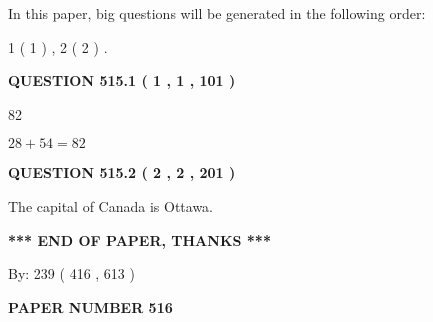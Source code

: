 \documentclass[12pt]{article}
\begin{document}
In this paper, big questions will be generated in the following order: 
   
   
   1 ( 1 )
 ,
   2 ( 2 )
 .
  
\vspace{0.2in}
  
{\textbf{\Large{QUESTION
515.1 
 ( 1 , 1 , 101 )
}}}
  
  
 
 
\noindent{}

82
 
 
 
 
\noindent{}

$ %
28 +  %
54=   %
82$
 
 
  
\vspace{0.2in}
  
{\textbf{\Large{QUESTION
515.2 
 ( 2 , 2 , 201 )
}}}
  
  
 
 
\noindent{}
 
 
The capital of Canada is Ottawa.
 
 
 
 
   
   
 \vspace{0.2in}
 
   
   
   
   
\vspace{1.0in} 
{\textbf{\large{ *** END OF PAPER, THANKS *** }}} 
   
   
\hspace{1.0in} By: 
 239 ( 416 ,  613 )
   
   
   
   
\newpage 
\setcounter{page}{ 
   516001 } 
   
   
   
   
 {\textbf{ \Large{ PAPER NUMBER  516  }}}
   
   
\vspace{0.2in}
   
   
   
   
   
\end{document}
